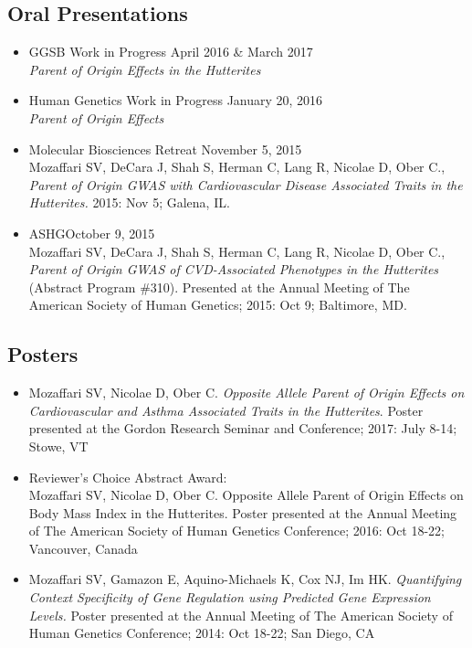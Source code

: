 \documentclass[a4paper, 11pt]{article}
\begin{document}
\subsection*{Oral Presentations}
\begin{itemize}
	\item GGSB Work in Progress \hfill April 2016 \& March 2017\\ \emph{Parent of Origin Effects in the Hutterites}
  	\item Human Genetics Work in Progress \hfill January 20, 2016\\ \emph{Parent of Origin Effects} 
	\item Molecular Biosciences Retreat \hfill November 5, 2015\\ Mozaffari SV, DeCara J, Shah S, Herman C, Lang R, Nicolae D, Ober C., \emph{Parent of Origin GWAS with Cardiovascular Disease Associated Traits in the Hutterites.} 2015: Nov 5; Galena, IL.
    \item ASHG\hfill October 9, 2015\\ Mozaffari SV, DeCara J, Shah S, Herman C, Lang R, Nicolae D, Ober C., \emph{Parent of Origin GWAS of CVD-Associated Phenotypes in the Hutterites} (Abstract Program \#310). Presented at the Annual Meeting of The American Society of Human Genetics; 2015: Oct 9; Baltimore, MD. 
  

\end{itemize}

\subsection*{Posters}
\begin{itemize}
    \item Mozaffari SV, Nicolae D, Ober C. \emph{Opposite Allele Parent of Origin Effects on Cardiovascular and Asthma Associated Traits in the Hutterites}. Poster presented at the Gordon Research Seminar and Conference; 2017: July 8-14; Stowe, VT
    \item Reviewer's Choice Abstract Award: \\Mozaffari SV, Nicolae D, Ober C. Opposite Allele Parent of Origin Effects on Body Mass Index in the Hutterites. Poster presented at the Annual Meeting of The American Society of Human Genetics Conference; 2016: Oct 18-22; Vancouver, Canada
    \item Mozaffari SV, Gamazon E, Aquino-Michaels K, Cox NJ, Im HK. \emph{Quantifying Context Specificity of Gene Regulation using Predicted Gene Expression Levels.} Poster presented at the Annual Meeting of The American Society of Human Genetics Conference; 2014: Oct 18-22; San Diego, CA 

\end{itemize}
\end{document}
